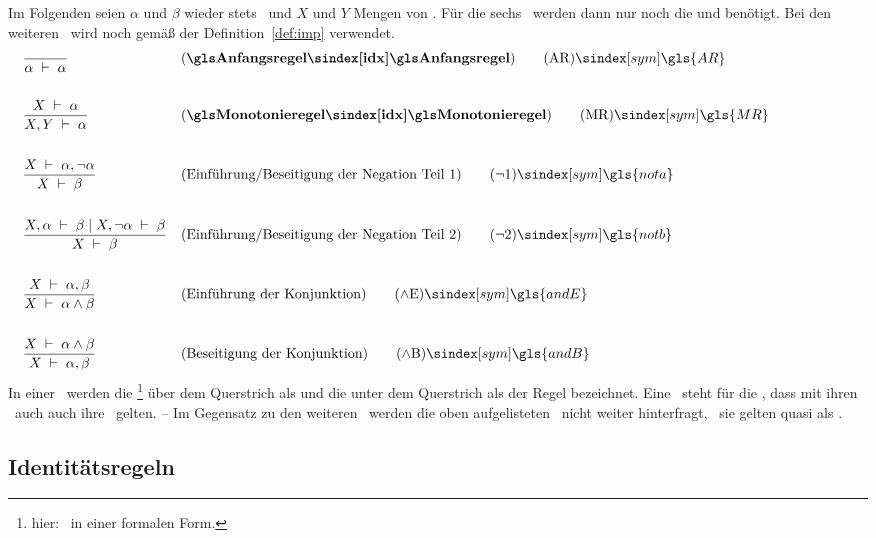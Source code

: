{Im Folgenden seien $\alpha$ und $\beta$ wieder stets \Formeln\ und $X$ und $Y$ Mengen von \Formeln.
Für die sechs \Basisregeln\ werden dann nur noch die \Junktoren \chrqt{$\lnot$} und \chrqt{$\land$} benötigt.
Bei den weiteren \Schlussregeln\ wird noch \chrqt{$\limp$} gemäß der Definition~\vref{def:imp} verwendet.
%
\begin{align}
	& \frac{}{\alpha\derive\alpha}
	& & (\text{\defn{\Anfangsregel}})
	\tag{\tagAR} \sym{\gls{AR}} \label{def:Anfangsregel}
	\\\\
	& \frac{X\derive\alpha}{X,Y\derive\alpha}
	& & (\text{\defn{\Monotonieregel}})
	\tag{\tagMR} \sym{\gls{MR}} \label{def:Monotonieregel}
	\\\\
	& \frac{X\derive\alpha,\lnot\alpha}{X\derive\beta}
	& & (\text{Einführung/Beseitigung der Negation Teil 1})
	\tag{\tagnota} \sym{\gls{nota}} \label{def:nota}
	\\\\
	& \frac{X,\alpha\derive\beta \srand X,\lnot\alpha\derive\beta}{X\derive\beta}
	& & (\text{Einführung/Beseitigung der Negation Teil 2})
	\tag{\tagnotb} \sym{\gls{notb}} \label{def:notb}
	\\\\
	& \frac{X\derive\alpha,\beta}{X\derive\alpha\land\beta}
	& & (\text{Einführung der Konjunktion})
	\tag{\tagandE} \sym{\gls{andE}} \label{def:andE}
	\\\\
	& \frac{X\derive\alpha\land\beta}{X\derive\alpha,\beta}
	& & (\text{Beseitigung der Konjunktion})
	\tag{\tagandB} \sym{\gls{andB}} \label{def:andB}
	\formulatoleft
\end{align}
%
In einer \Schlussregel\ werden die \Formeln%
\footnote{hier: \Aussagen\ in einer formalen Form.}
über dem Querstrich als  und die unter dem Querstrich als  der Regel bezeichnet.
Eine \Schlussregel\ steht für die \Aussage, dass mit ihren \Voraussetzungen\ auch auch ihre \Folgerungen\ gelten.
-- Im Gegensatz zu den weiteren \Schlussregeln\ werden die oben aufgelisteten \Basisregeln\ nicht weiter hinterfragt, \textdh\ sie gelten quasi als \Axiome.

\subsection{Identitätsregeln}%
\label{sub:Identitätsregeln}

}
